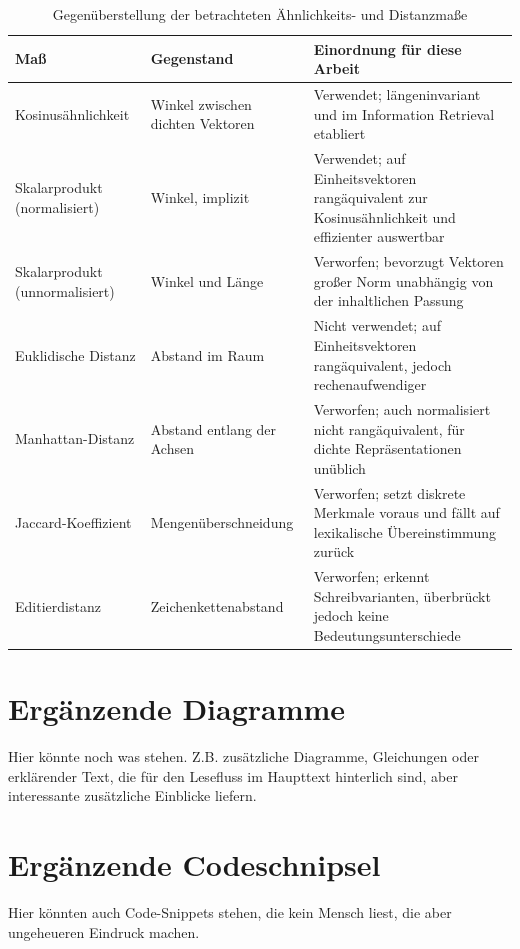 \begin{table}[htbp]
\centering
\caption{Gegenüberstellung der betrachteten Ähnlichkeits- und Distanzmaße}
\label{tab:aehnlichkeitsmasse}
\small
\begin{tabular}{p{3.0cm}p{3.4cm}p{6.4cm}}
\hline
\textbf{Maß} & \textbf{Gegenstand} & \textbf{Einordnung für diese Arbeit} \\
\hline
Kosinusähnlichkeit & Winkel zwischen dichten Vektoren & Verwendet; längeninvariant und im Information Retrieval etabliert \\
Skalarprodukt (normalisiert) & Winkel, implizit & Verwendet; auf Einheitsvektoren rangäquivalent zur Kosinusähnlichkeit und effizienter auswertbar \\
Skalarprodukt (unnormalisiert) & Winkel und Länge & Verworfen; bevorzugt Vektoren großer Norm unabhängig von der inhaltlichen Passung \\
Euklidische Distanz & Abstand im Raum & Nicht verwendet; auf Einheitsvektoren rangäquivalent, jedoch rechenaufwendiger \\
Manhattan-Distanz & Abstand entlang der Achsen & Verworfen; auch normalisiert nicht rangäquivalent, für dichte Repräsentationen unüblich \\
Jaccard-Koeffizient & Mengenüberschneidung & Verworfen; setzt diskrete Merkmale voraus und fällt auf lexikalische Übereinstimmung zurück \\
Editierdistanz & Zeichenketten\-abstand & Verworfen; erkennt Schreibvarianten, überbrückt jedoch keine Bedeutungsunterschiede \\
\hline
\end{tabular}
\end{table}

\section{Ergänzende Diagramme}
\label{Anhang_Diagramme}

Hier könnte noch was stehen. Z.B. zusätzliche Diagramme, Gleichungen
oder erklärender Text, die für den Lesefluss im Haupttext hinterlich
sind, aber interessante zusätzliche Einblicke liefern.

\section{Ergänzende Codeschnipsel}
\label{Anhang_Code}

Hier könnten auch Code-Snippets stehen, die kein Mensch liest, die
aber ungeheueren Eindruck machen.
